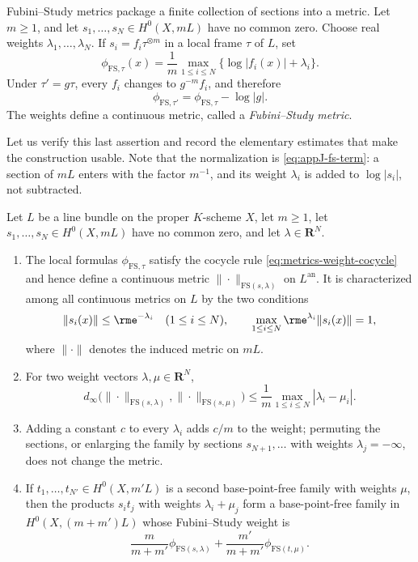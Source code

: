 Fubini--Study metrics package a finite collection of sections into a metric.
Let $m\geq1$, and let $s_1,\ldots,s_N\in H^0(X,mL)$ have no common zero.
Choose real weights $\lambda_1,\ldots,\lambda_N$. If
$s_i=f_i\tau^{\otimes m}$ in a local frame $\tau$ of $L$, set
\[
 \phi_{\mathrm{FS},\tau}(x)
     =\frac1m\max_{1\leq i\leq N}
                    \{\log|f_i(x)|+\lambda_i\}.
\]
Under $\tau'=g\tau$, every $f_i$ changes to $g^{-m}f_i$, and therefore
\[
                 \phi_{\mathrm{FS},\tau'}
                 =\phi_{\mathrm{FS},\tau}-\log|g|.
\]
The weights define a continuous metric, called a
\emph{Fubini--Study metric}.

Let us verify this last assertion and record the elementary estimates that
make the construction usable. Note that the normalization is
\eqref{eq:appJ-fs-term}: a section of $mL$ enters with the factor
$m^{-1}$, and its weight $\lambda_i$ is added to $\log|s_i|$, not
subtracted.

\begin{proposition}
\label{prop:metrics-fs-basic}
Let $L$ be a line bundle on the proper $K$-scheme $X$, let
$m\ge1$, let $s_1,\ldots,s_N\in H^0(X,mL)$ have no common zero, and let
$\lambda\in\mathbf R^N$.
\begin{enumerate}
\item The local formulas $\phi_{\mathrm{FS},\tau}$ satisfy the cocycle
rule \eqref{eq:metrics-weight-cocycle} and hence define a continuous metric
$\|\cdot\|_{\mathrm{FS}(s,\lambda)}$ on $L^{\mathrm{an}}$. It is
characterized among all continuous metrics on $L$ by the two conditions
\begin{equation}
\label{eq:metrics-fs-characterization}
 \|s_i(x)\|\le\rme^{-\lambda_i}\quad(1\le i\le N),
 \qquad
 \max_{1\le i\le N}\rme^{\lambda_i}\|s_i(x)\|=1,
\end{equation}
where $\|\cdot\|$ denotes the induced metric on $mL$.
\item For two weight vectors $\lambda,\mu\in\mathbf R^N$,
\[
 d_\infty\bigl(\|\cdot\|_{\mathrm{FS}(s,\lambda)},
 \|\cdot\|_{\mathrm{FS}(s,\mu)}\bigr)
 \le\frac1m\max_{1\le i\le N}|\lambda_i-\mu_i| .
\]
\item Adding a constant $c$ to every $\lambda_i$ adds $c/m$ to the
weight; permuting the sections, or enlarging the family by sections
$s_{N+1},\ldots$ with weights $\lambda_j=-\infty$, does not change the
metric.
\item If $t_1,\ldots,t_{N'}\in H^0(X,m'L)$ is a second base-point-free
family with weights $\mu$, then the products $s_it_j$ with weights
$\lambda_i+\mu_j$ form a base-point-free family in $H^0(X,(m+m')L)$
whose Fubini--Study weight is
\[
 \frac{m}{m+m'}\phi_{\mathrm{FS}(s,\lambda)}
 +\frac{m'}{m+m'}\phi_{\mathrm{FS}(t,\mu)}.
\]
\end{enumerate}
\end{proposition}

